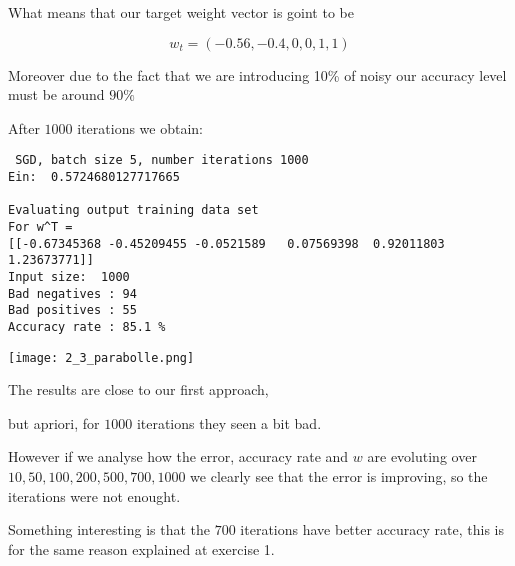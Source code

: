                  What means that our target weight vector is goint to be

                 $$w_t = (-0.56, -0.4, 0,0,1,1)$$

                 Moreover due to the fact that we are introducing 10\% of noisy our accuracy level must be around $90\%$

                After $1000$ iterations we obtain:

 \begin{verbatim}
 SGD, batch size 5, number iterations 1000
Ein:  0.5724680127717665

Evaluating output training data set
For w^T = 
[[-0.67345368 -0.45209455 -0.0521589   0.07569398  0.92011803  1.23673771]]
Input size:  1000
Bad negatives : 94
Bad positives : 55
Accuracy rate : 85.1 %

\end{verbatim}

                \texttt{[image: 2\_3\_parabolle.png]}

                
                
                The results are close to our first approach,
                
                but apriori, for $1000$ iterations they seen a bit bad.

                However if we analyse how the error, accuracy rate and $w$ are evoluting over $10, 50, 100, 200, 500, 700, 1000$ we clearly see that the error is improving, so the iterations were not enought.

                Something interesting is that the $700$ iterations have better accuracy rate, this is for the same reason explained at exercise 1.   
       

